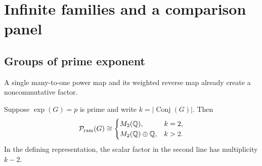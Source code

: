 \section{Infinite families and a comparison panel}
\label{sec:families}

\subsection{Groups of prime exponent}

A single many-to-one power map and its weighted reverse map already create
a noncommutative factor.

\begin{theorem}
\label{thm:prime-exponent-structural}
Suppose \(\exp(G)=p\) is prime and write \(k=|\operatorname{Conj}(G)|\).
Then
\begin{equation}
 \mathcal P_{\mathrm{ram}}(G)\cong
 \begin{cases}
 M_2(\mathbb Q),&k=2,\\
 M_2(\mathbb Q)\oplus\mathbb Q,&k>2.
 \end{cases}
 \label{eq:prime-exponent-type-structural}
\end{equation}
In the defining representation, the scalar factor in the second line has
multiplicity \(k-2\).
\end{theorem}


